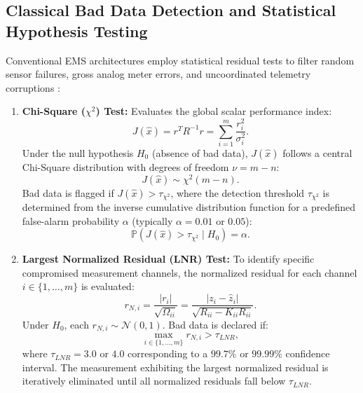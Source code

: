 \documentclass[journal,compsoc]{IEEEtran}
\begin{document}
\subsection{Classical Bad Data Detection and Statistical Hypothesis Testing}
Conventional EMS architectures employ statistical residual tests to filter random sensor failures, gross analog meter errors, and uncoordinated telemetry corruptions \cite{ref10}:
\begin{enumerate}
    \item \textbf{Chi-Square ($\chi^2$) Test:} Evaluates the global scalar performance index:
    \begin{equation}
        J(\hat{x}) = r^T R^{-1} r = \sum_{i=1}^m \frac{r_i^2}{\sigma_i^2}.
    \end{equation}
    Under the null hypothesis $H_0$ (absence of bad data), $J(\hat{x})$ follows a central Chi-Square distribution with degrees of freedom $\nu = m - n$:
    \begin{equation}
        J(\hat{x}) \sim \chi^2(m - n).
    \end{equation}
    Bad data is flagged if $J(\hat{x}) > \tau_{\chi^2}$, where the detection threshold $\tau_{\chi^2}$ is determined from the inverse cumulative distribution function for a predefined false-alarm probability $\alpha$ (typically $\alpha = 0.01$ or $0.05$):
    \begin{equation}
        \mathbb{P}(J(\hat{x}) > \tau_{\chi^2} \mid H_0) = \alpha.
    \end{equation}
    \item \textbf{Largest Normalized Residual (LNR) Test:} To identify specific compromised measurement channels, the normalized residual for each channel $i \in \{1, \dots, m\}$ is evaluated:
    \begin{equation}
        r_{N,i} = \frac{|r_i|}{\sqrt{\Omega_{ii}}} = \frac{|z_i - \hat{z}_i|}{\sqrt{R_{ii} - K_{ii} R_{ii}}}.
    \end{equation}
    Under $H_0$, each $r_{N,i} \sim \mathcal{N}(0, 1)$. Bad data is declared if:
    \begin{equation}
        \max_{i \in \{1, \dots, m\}} r_{N,i} > \tau_{LNR},
    \end{equation}
    where $\tau_{LNR} = 3.0$ or $4.0$ corresponding to a $99.7\%$ or $99.99\%$ confidence interval. The measurement exhibiting the largest normalized residual is iteratively eliminated until all normalized residuals fall below $\tau_{LNR}$.
\end{enumerate}
\end{document}
